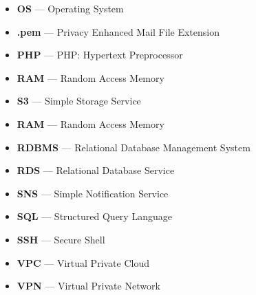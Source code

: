 \begin{itemize}
    \item  \textbf{OS} \tab— Operating System
    \item  \textbf{.pem} \tab— Privacy Enhanced Mail File Extension
    \item  \textbf{PHP} \tab— PHP: Hypertext Preprocessor
    \item  \textbf{RAM} \tab— Random Access Memory
    \item  \textbf{S3} \tab— Simple Storage Service
    \item  \textbf{RAM} \tab— Random Access Memory
    \item  \textbf{RDBMS} \tab— Relational Database Management System
    \item  \textbf{RDS} \tab— Relational Database Service
    \item  \textbf{SNS} \tab— Simple Notification Service
    \item  \textbf{SQL} \tab— Structured Query Language
    \item  \textbf{SSH} \tab— Secure Shell
    \item  \textbf{VPC} \tab— Virtual Private Cloud
    \item  \textbf{VPN} \tab— Virtual Private Network
\end{itemize}